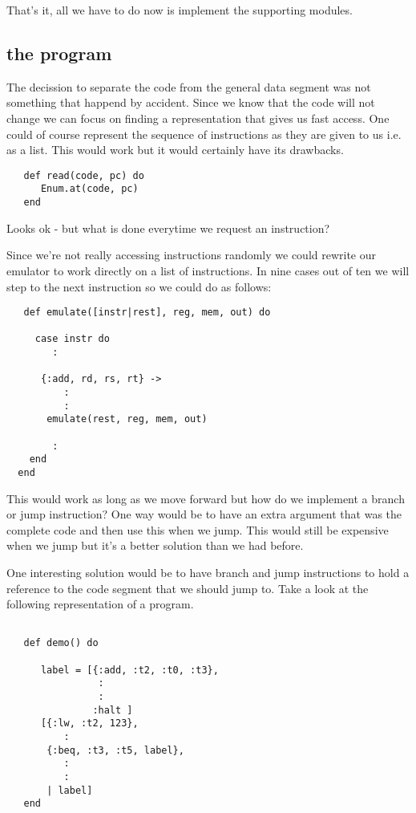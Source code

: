 \documentclass[a4paper,11pt]{article}
\begin{document}
 That's it, all we have to do now is implement the supporting modules.

 \subsection{the program}

 The decission to separate the code from the general data segment was
 not something that happend by accident. Since we know that the code
 will not change we can focus on finding a representation that gives
 us fast access. One could of course represent the sequence of
 instructions as they are given to us i.e. as a list. This would work
 but it would certainly have its drawbacks.

 \begin{verbatim}
   def read(code, pc) do
      Enum.at(code, pc)
   end
 \end{verbatim}

 Looks ok - but what is done everytime we request an instruction?

 Since we're not really accessing instructions randomly we could
 rewrite our emulator to work directly on a list of instructions. In
 nine cases out of ten we will step to the next instruction so we could do as follows:

 \begin{verbatim}
   def emulate([instr|rest], reg, mem, out) do

     case instr do
        :
        
      {:add, rd, rs, rt} ->
          :
          :
       emulate(rest, reg, mem, out)

        :
    end
  end
 \end{verbatim}

 This would work as long as we move forward but how do we implement a
 branch or jump instruction? One way would be to have an extra
 argument that was the complete code and then use this when we
 jump. This would still be expensive when we jump but it's a better
 solution than we had before.

 One interesting solution would be to have branch and jump
 instructions to hold a reference to the code segment that we should
 jump to. Take a look at the following representation of a program.

 \begin{verbatim}

   def demo() do

      label = [{:add, :t2, :t0, :t3},
                :
                :
               :halt ]  
      [{:lw, :t2, 123},
          :
       {:beq, :t3, :t5, label},
          :
          :
       | label]
   end
 \end{verbatim}
\end{document}
